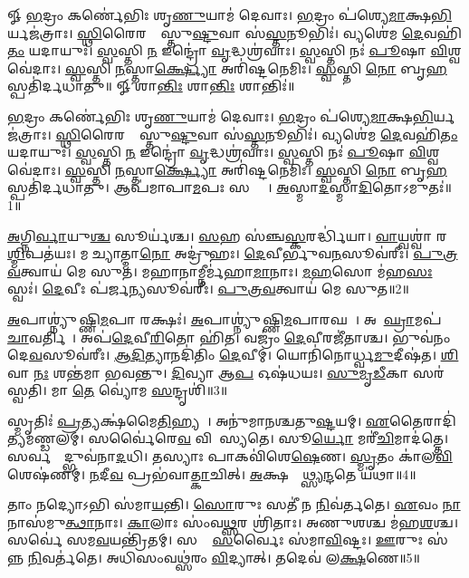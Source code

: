 \setcounter{anuvakam}{0}
𑍐 \ul{𑌭}𑌦𑍍𑌰𑌂 𑌕𑌰𑍍𑌣𑍇॑𑌭𑌿𑌃 𑌶𑍃\ul{𑌣𑍁}𑌯𑌾𑌮॑ 𑌦𑍇𑌵𑌾𑌃। \ul{𑌭}𑌦𑍍𑌰𑌂 𑌪॑𑌶𑍍𑌯𑍇\ul{𑌮𑌾}𑌕𑍍𑌷\ul{𑌭𑌿}𑌰𑍍𑌯𑌜॑𑌤𑍍𑌰𑌾𑌃। 
\ul{𑌸𑍍𑌥𑌿}𑌰𑍈𑌰𑌙𑍍𑌗𑍈᳚𑌸𑍍𑌤𑍁\ul{𑌷𑍍𑌟𑍁}𑌵𑌾 𑌸॑\ul{𑌸𑍍𑌤}𑌨𑍂𑌭𑌿𑌃॑। 𑌵𑍍𑌯𑌶𑍇॑𑌮 \ul{𑌦𑍇}𑌵𑌹𑌿॑\ul{𑌤𑌂} 𑌯𑌦𑌾𑌯𑍁𑌃॑। 
\ul{𑌸𑍍𑌵}𑌸𑍍𑌤𑌿 \ul{𑌨} 𑌇𑌨𑍍𑌦𑍍𑌰𑍋॑ \ul{𑌵𑍃}𑌦𑍍𑌧𑌶𑍍𑌰॑𑌵𑌾𑌃। \ul{𑌸𑍍𑌵}𑌸𑍍𑌤𑌿 𑌨𑌃॑ \ul{𑌪𑍂}𑌷𑌾 \ul{𑌵𑌿}𑌶𑍍𑌵𑌵𑍇॑𑌦𑌾𑌃। 
\ul{𑌸𑍍𑌵}𑌸𑍍𑌤𑌿 \ul{𑌨}𑌸𑍍𑌤𑌾\ul{𑌰𑍍𑌕𑍍𑌷𑍍𑌯𑍋} 𑌅𑌰𑌿॑𑌷𑍍𑌟𑌨𑍇𑌮𑌿𑌃। \ul{𑌸𑍍𑌵}𑌸𑍍𑌤𑌿 \ul{𑌨𑍋} 𑌬𑍃\ul{𑌹}𑌸𑍍𑌪𑌤𑌿॑𑌰𑍍𑌦𑌧𑌾𑌤𑍁॥
𑍐 𑌶𑌾\ul{𑌨𑍍𑌤𑌿𑌃} 𑌶𑌾\ul{𑌨𑍍𑌤𑌿𑌃} 𑌶𑌾𑌨𑍍𑌤𑌿𑌃॑॥

\ul{𑌭}𑌦𑍍𑌰𑌂 𑌕𑌰𑍍𑌣𑍇॑𑌭𑌿𑌃 𑌶𑍃\ul{𑌣𑍁}𑌯𑌾𑌮॑ 𑌦𑍇𑌵𑌾𑌃। \ul{𑌭}𑌦𑍍𑌰𑌂 𑌪॑𑌶𑍍𑌯𑍇\ul{𑌮𑌾}𑌕𑍍𑌷\ul{𑌭𑌿}𑌰𑍍𑌯𑌜॑𑌤𑍍𑌰𑌾𑌃। 
\ul{𑌸𑍍𑌥𑌿}𑌰𑍈𑌰𑌙𑍍𑌗𑍈᳚𑌸𑍍𑌤𑍁\ul{𑌷𑍍𑌟𑍁}𑌵𑌾 𑌸॑\ul{𑌸𑍍𑌤}𑌨𑍂𑌭𑌿𑌃॑। 𑌵𑍍𑌯𑌶𑍇॑𑌮 \ul{𑌦𑍇}𑌵𑌹𑌿॑\ul{𑌤𑌂} 𑌯𑌦𑌾𑌯𑍁𑌃॑। 
\ul{𑌸𑍍𑌵}𑌸𑍍𑌤𑌿 \ul{𑌨} 𑌇𑌨𑍍𑌦𑍍𑌰𑍋॑ \ul{𑌵𑍃}𑌦𑍍𑌧𑌶𑍍𑌰॑𑌵𑌾𑌃। \ul{𑌸𑍍𑌵}𑌸𑍍𑌤𑌿 𑌨𑌃॑ \ul{𑌪𑍂}𑌷𑌾 \ul{𑌵𑌿}𑌶𑍍𑌵𑌵𑍇॑𑌦𑌾𑌃। 
\ul{𑌸𑍍𑌵}𑌸𑍍𑌤𑌿 \ul{𑌨}𑌸𑍍𑌤𑌾\ul{𑌰𑍍𑌕𑍍𑌷𑍍𑌯𑍋} 𑌅𑌰𑌿॑𑌷𑍍𑌟𑌨𑍇𑌮𑌿𑌃। \ul{𑌸𑍍𑌵}𑌸𑍍𑌤𑌿 \ul{𑌨𑍋} 𑌬𑍃\ul{𑌹}𑌸𑍍𑌪𑌤𑌿॑𑌰𑍍𑌦𑌧𑌾𑌤𑍁। 
𑌆𑌪॑𑌮𑌾𑌪𑌾\ul{𑌮}𑌪𑌃 𑌸𑌰𑍍𑌵𑌾𑌃᳚। \ul{𑌅}𑌸𑍍𑌮𑌾\ul{𑌦}𑌸𑍍𑌮𑌾\ul{𑌦𑌿}𑌤𑍋𑌽𑌮𑍁𑌤𑌃॑॥1॥ 

\ul{𑌅}𑌗𑍍𑌨𑌿\ul{𑌰𑍍𑌵𑌾}𑌯𑍁\ul{𑌶𑍍𑌚} 𑌸𑍂𑌰𑍍𑌯॑𑌶𑍍𑌚। \ul{𑌸}𑌹 𑌸॑𑌞𑍍𑌚\ul{𑌸𑍍𑌕}𑌰𑌰𑍍𑌦𑍍𑌧𑌿॑𑌯𑌾। 
\ul{𑌵𑌾}𑌯𑍍𑌵𑌶𑍍𑌵𑌾॑ 𑌰\ul{𑌶𑍍𑌮𑌿}𑌪𑌤॑𑌯𑌃। 𑌮𑌰𑍀᳚𑌚𑍍𑌯𑌾𑌤𑍍𑌮𑌾\ul{𑌨𑍋} 𑌅𑌦𑍍𑌰𑍁॑𑌹𑌃। 
\ul{𑌦𑍇}𑌵𑍀𑌰𑍍𑌭𑍁॑𑌵\ul{𑌨}𑌸𑍂𑌵॑𑌰𑍀𑌃। \ul{𑌪𑍁}\ul{𑌤𑍍𑌰}\ul{𑌵}𑌤𑍍𑌵𑌾𑌯॑ 𑌮𑍇 𑌸𑍁𑌤। 
𑌮𑌹𑌾𑌨𑌾𑌮𑍍𑌨𑍀𑌰𑍍𑌮॑𑌹𑌾\ul{𑌮𑌾}𑌨𑌾𑌃। \ul{𑌮}\ul{𑌹}𑌸𑍋 𑌮॑𑌹\ul{𑌸𑌃} 𑌸𑍍𑌵𑌃॑। 
\ul{𑌦𑍇}𑌵𑍀𑌃 𑌪॑𑌰𑍍𑌜\ul{𑌨𑍍𑌯}𑌸𑍂𑌵॑𑌰𑍀𑌃। \ul{𑌪𑍁}\ul{𑌤𑍍𑌰}\ul{𑌵}𑌤𑍍𑌵𑌾𑌯॑ 𑌮𑍇 𑌸𑍁𑌤॥2॥

\ul{𑌅}𑌪𑌾𑌶𑍍𑌨𑍍𑌯𑍁॑𑌷𑍍𑌣𑌿\ul{𑌮}𑌪𑌾 𑌰𑌕𑍍𑌷𑌃॑। \ul{𑌅}𑌪𑌾𑌶𑍍𑌨𑍍𑌯𑍁॑𑌷𑍍𑌣𑌿\ul{𑌮}𑌪𑌾𑌰𑌘𑌮𑍍᳚। 
𑌅𑌪𑌾᳚\ul{𑌘𑍍𑌰𑌾}𑌮𑌪॑ \ul{𑌚𑌾}𑌵𑌰𑍍𑌤𑌿𑌮𑍍᳚। 𑌅𑌪॑\ul{𑌦𑍇}𑌵𑍀\ul{𑌰𑌿}𑌤𑍋 𑌹𑌿॑𑌤। 
𑌵𑌜𑍍𑌰𑌂॑ \ul{𑌦𑍇}𑌵𑍀𑌰𑌜𑍀॑𑌤𑌾𑌶𑍍𑌚। 𑌭𑍁𑌵॑𑌨𑌂 𑌦𑍇\ul{𑌵}𑌸𑍂𑌵॑𑌰𑍀𑌃। 
\ul{𑌆}\ul{𑌦𑌿}𑌤𑍍𑌯𑌾𑌨𑌦𑌿॑𑌤𑌿𑌂 \ul{𑌦𑍇}𑌵𑍀𑌮𑍍। 𑌯𑍋𑌨𑌿॑𑌨𑍋𑌰𑍍𑌧𑍍𑌵\ul{𑌮𑍁}𑌦𑍀𑌷॑𑌤। 
\ul{𑌶𑌿}𑌵𑌾 \ul{𑌨𑌃} 𑌶𑌨𑍍𑌤॑𑌮𑌾 𑌭𑌵𑌨𑍍𑌤𑍁। \ul{𑌦𑌿}𑌵𑍍𑌯𑌾 𑌆\ul{𑌪} 𑌓𑌷॑𑌧𑌯𑌃। 
\ul{𑌸𑍁}\ul{𑌮𑍃}\ul{𑌡𑍀}𑌕𑌾 𑌸𑌰॑𑌸𑍍𑌵𑌤𑌿। 𑌮𑌾 \ul{𑌤𑍇} 𑌵𑍍𑌯𑍋॑𑌮 \ul{𑌸}𑌨𑍍𑌦𑍃𑌶𑌿॑॥3॥\anuvakamend


𑌸𑍍𑌮𑍃𑌤𑌿𑌃॑ \ul{𑌪𑍍𑌰}𑌤𑍍𑌯𑌕𑍍𑌷॑𑌮𑍈\ul{𑌤𑌿}𑌹𑍍𑌯𑌮𑍍᳚। 𑌅𑌨𑍁॑𑌮𑌾𑌨𑌶𑍍𑌚𑌤𑍁\ul{𑌷𑍍𑌟}𑌯𑌮𑍍‌। 
\ul{𑌏}𑌤𑍈𑌰𑌾𑌦𑌿॑𑌤𑍍𑌯\-𑌮𑌣𑍍𑌡𑌲𑌮𑍍‌। 𑌸𑌰𑍍𑌵𑍈॑𑌰𑍇\ul{𑌵} 𑌵𑌿𑌧𑌾᳚᳚𑌸𑍍𑌯𑌤𑍇। 
𑌸𑍂\ul{𑌰𑍍𑌯𑍋} 𑌮𑌰𑍀॑\ul{𑌚𑌿}𑌮𑌾𑌦॑𑌤𑍍𑌤𑍇। 𑌸𑌰𑍍𑌵𑌸𑍍𑌮𑌾᳚𑌦𑍍𑌭𑍁𑌵॑𑌨𑌾\ul{𑌦}𑌧𑌿। 
𑌤𑌸𑍍𑌯𑌾𑌃 𑌪𑌾𑌕𑌵𑌿॑𑌶𑍇\ul{𑌷𑍇}𑌣। \ul{𑌸𑍍𑌮𑍃}𑌤𑌂 𑌕𑌾॑𑌲\-\ul{𑌵𑌿}𑌶𑍇𑌷॑𑌣𑌮𑍍‌। 
\ul{𑌨}𑌦𑍀\ul{𑌵} 𑌪𑍍𑌰𑌭॑𑌵𑌾\ul{𑌤𑍍𑌕𑌾}𑌚𑌿𑌤𑍍‌। \ul{𑌅}𑌕𑍍𑌷𑌯𑍍𑌯𑌾᳚𑌥𑍍𑌸𑍍𑌯\ul{𑌨𑍍𑌦}𑌤𑍇 𑌯॑𑌥𑌾॥4॥

𑌤𑌾𑌂 𑌨𑌦𑍍𑌯𑍋𑌽𑌭𑌿 𑌸॑𑌮𑌾\ul{𑌯}𑌨𑍍𑌤𑌿। \ul{𑌸𑍋}𑌰𑍁𑌃 𑌸𑌤𑍀॑ 𑌨 \ul{𑌨𑌿}𑌵॑𑌰𑍍𑌤𑌤𑍇। 
\ul{𑌏}𑌵𑌂 \ul{𑌨𑌾}𑌨𑌾𑌸॑𑌮𑍁\ul{𑌤𑍍𑌥𑌾}𑌨𑌾𑌃। \ul{𑌕𑌾}𑌲𑌾𑌃 𑌸𑌂॑𑌵\ul{𑌥𑍍𑌸}𑌰 𑌶𑍍𑌰𑌿॑𑌤𑌾𑌃। 
 𑌅𑌣𑍁𑌶𑌶𑍍𑌚 𑌮॑𑌹\ul{𑌶}𑌶𑍍𑌚। 𑌸𑌰𑍍𑌵𑍇॑ 𑌸𑌮\ul{𑌵}𑌯𑌨𑍍𑌤𑍍𑌰𑌿॑𑌤𑌮𑍍‌। 
𑌸𑌤𑍈𑌃᳚ \ul{𑌸}𑌰𑍍𑌵𑍈𑌃 𑌸॑𑌮𑌾\ul{𑌵𑌿}𑌷𑍍𑌟𑌃। \ul{𑌊}𑌰𑍁𑌃 𑌸॑𑌨𑍍𑌨 \ul{𑌨𑌿}𑌵𑌰𑍍𑌤॑𑌤𑍇। 
𑌅𑌧𑌿𑌸𑌂𑌵𑌥𑍍𑌸॑𑌰𑌂 \ul{𑌵𑌿}𑌦𑍍𑌯𑌾𑌤𑍍‌। 𑌤𑌦𑍇𑌵॑ 𑌲\ul{𑌕𑍍𑌷}𑌣𑍇॥5॥

